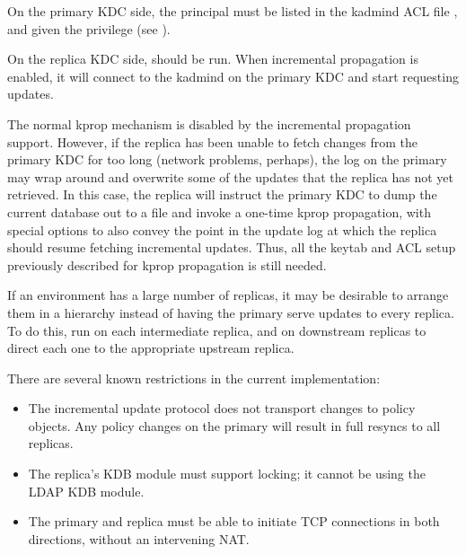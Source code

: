 \documentclass[letterpaper,10pt,english]{sphinxmanual}
\begin{document}
On the primary KDC side, the  principal must be
listed in the kadmind ACL file {\hyperref[\detokenize{admin/conf_files/kadm5_acl:kadm5-acl-5}]{}}, and given the
 privilege (see {\hyperref[\detokenize{admin/database:privileges}]{}}).

On the replica KDC side, {\hyperref[\detokenize{admin/admin_commands/kpropd:kpropd-8}]{}} should be run.  When
incremental propagation is enabled, it will connect to the kadmind on
the primary KDC and start requesting updates.

The normal kprop mechanism is disabled by the incremental propagation
support.  However, if the replica has been unable to fetch changes
from the primary KDC for too long (network problems, perhaps), the log
on the primary may wrap around and overwrite some of the updates that
the replica has not yet retrieved.  In this case, the replica will
instruct the primary KDC to dump the current database out to a file
and invoke a one-time kprop propagation, with special options to also
convey the point in the update log at which the replica should resume
fetching incremental updates.  Thus, all the keytab and ACL setup
previously described for kprop propagation is still needed.

If an environment has a large number of replicas, it may be desirable
to arrange them in a hierarchy instead of having the primary serve
updates to every replica.  To do this, run  on
each intermediate replica, and  on
downstream replicas to direct each one to the appropriate upstream
replica.

There are several known restrictions in the current implementation:
\begin{itemize}
\item {} 
The incremental update protocol does not transport changes to policy
objects.  Any policy changes on the primary will result in full
resyncs to all replicas.

\item {} 
The replica’s KDB module must support locking; it cannot be using the
LDAP KDB module.

\item {} 
The primary and replica must be able to initiate TCP connections in
both directions, without an intervening NAT.

\end{itemize}
\end{document}
